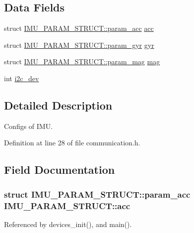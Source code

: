 \subsection*{Data Fields}
\begin{DoxyCompactItemize}
\item 
struct \hyperlink{structIMU__PARAM__STRUCT_1_1param__acc}{I\-M\-U\-\_\-\-P\-A\-R\-A\-M\-\_\-\-S\-T\-R\-U\-C\-T\-::param\-\_\-acc} \hyperlink{structIMU__PARAM__STRUCT_a92172e4757d0f8f9135a659e406c12e5}{acc}
\item 
struct \hyperlink{structIMU__PARAM__STRUCT_1_1param__gyr}{I\-M\-U\-\_\-\-P\-A\-R\-A\-M\-\_\-\-S\-T\-R\-U\-C\-T\-::param\-\_\-gyr} \hyperlink{structIMU__PARAM__STRUCT_a5a4557868f1af679a1098808397b02ec}{gyr}
\item 
struct \hyperlink{structIMU__PARAM__STRUCT_1_1param__mag}{I\-M\-U\-\_\-\-P\-A\-R\-A\-M\-\_\-\-S\-T\-R\-U\-C\-T\-::param\-\_\-mag} \hyperlink{structIMU__PARAM__STRUCT_a26b277dcaf05f3842995df888225f6f4}{mag}
\item 
int \hyperlink{structIMU__PARAM__STRUCT_a8a870f383fc9ba0b682fdc9b8c0d2734}{i2c\-\_\-dev}
\end{DoxyCompactItemize}


\subsection{Detailed Description}
Configs of I\-M\-U. 

Definition at line 28 of file communication.\-h.



\subsection{Field Documentation}
\hypertarget{structIMU__PARAM__STRUCT_a92172e4757d0f8f9135a659e406c12e5}{
\subsubsection[{acc}]{\setlength{\rightskip}{0pt plus 5cm}struct {\bf I\-M\-U\-\_\-\-P\-A\-R\-A\-M\-\_\-\-S\-T\-R\-U\-C\-T\-::param\-\_\-acc} I\-M\-U\-\_\-\-P\-A\-R\-A\-M\-\_\-\-S\-T\-R\-U\-C\-T\-::acc}}\label{structIMU__PARAM__STRUCT_a92172e4757d0f8f9135a659e406c12e5}


Referenced by devices\-\_\-init(), and main().

